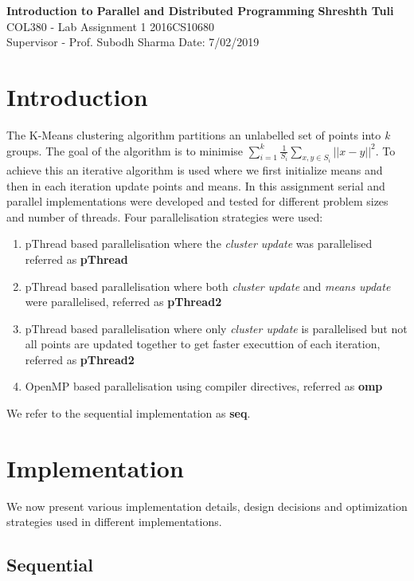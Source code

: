 \documentclass[a4paper, 11pt]{article}
\begin{document}
\noindent
\large\textbf{Introduction to Parallel and Distributed Programming} \hfill \textbf{Shreshth Tuli} \\
\normalsize COL380 - Lab Assignment 1 \hfill 2016CS10680\\
Supervisor - Prof. Subodh Sharma \hfill Date: 7/02/2019 \\

\section*{Introduction}

The K-Means clustering algorithm partitions an unlabelled set of points into \textit{k} groups. The goal of the algorithm is to minimise $\sum_{i=1}^k\frac{1}{S_i}\sum_{x,y\in S_i}||x-y||^2$. To achieve this an iterative algorithm is used where we first initialize means and then in each iteration update points and means. In this assignment serial and parallel implementations were developed and tested for different problem sizes and number of threads. Four parallelisation strategies were used:
\begin{enumerate}
    \item pThread based parallelisation where the \textit{cluster update} was parallelised referred as \textbf{pThread}
    \item pThread based parallelisation where both \textit{cluster update} and \textit{means update} were parallelised, referred as \textbf{pThread2}
    \item pThread based parallelisation where only \textit{cluster update} is parallelised but not all points are updated together to get faster executtion of each iteration, referred as \textbf{pThread2}
    \item OpenMP based parallelisation using compiler directives, referred as \textbf{omp}
\end{enumerate}
We refer to the sequential implementation as \textbf{seq}.

\section{Implementation}
We now present various implementation details, design decisions and optimization strategies used in different implementations.

\subsection{Sequential}
\end{document}

